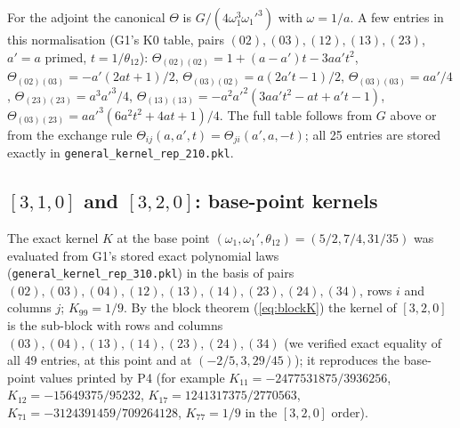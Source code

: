 \documentclass[11pt]{article}
\begin{document}
For the adjoint the canonical $\Theta$ is $G/(4\omega_1^3\omega_1'^3)$ with $\omega=1/a$. A few entries in this normalisation (G1's K0 table, pairs $(02),(03),(12),(13),(23)$, $a'=a$ primed, $t=1/\theta_{12}$): $\Theta_{(02)(02)}=1+(a-a')t-3aa't^2$, $\Theta_{(02)(03)}=-a'(2at+1)/2$, $\Theta_{(03)(02)}=a(2a't-1)/2$, $\Theta_{(03)(03)}=aa'/4$, $\Theta_{(23)(23)}=a^3a'^3/4$, $\Theta_{(13)(13)}=-a^2a'^2(3aa't^2-at+a't-1)$, $\Theta_{(03)(23)}=aa'^3(6a^2t^2+4at+1)/4$. The full table follows from $G$ above or from the exchange rule $\Theta_{ij}(a,a',t)=\Theta_{ji}(a',a,-t)$; all 25 entries are stored exactly in \texttt{general\_\allowbreak{}kernel\_\allowbreak{}rep\_\allowbreak{}210.\allowbreak{}pkl}.

\subsection{\texorpdfstring{$[3,1,0]$}{[3,1,0]} and \texorpdfstring{$[3,2,0]$}{[3,2,0]}: base-point kernels}\label{app:K310}

The exact kernel $K$ at the base point $(\omega_1,\omega_1',\theta_{12})=(5/2,7/4,31/35)$ was evaluated from G1's stored exact polynomial laws (\texttt{general\_\allowbreak{}kernel\_\allowbreak{}rep\_\allowbreak{}310.\allowbreak{}pkl}) in the basis of pairs $(02),(03),(04),(12),(13),(14),(23),(24),(34)$, rows $i$ and columns $j$; $K_{99}=1/9$. By the block theorem (\ref{eq:blockK}) the kernel of $[3,2,0]$ is the sub-block with rows and columns $(03),(04),(13),(14),(23),(24),(34)$ (we verified exact equality of all 49 entries, at this point and at $(-2/5,3,29/45)$); it reproduces the base-point values printed by P4 (for example $K_{11}=-2477531875/3936256$, $K_{12}=-15649375/95232$, $K_{17}=1241317375/2770563$, $K_{71}=-3124391459/709264128$, $K_{77}=1/9$ in the $[3,2,0]$ order).
\end{document}
